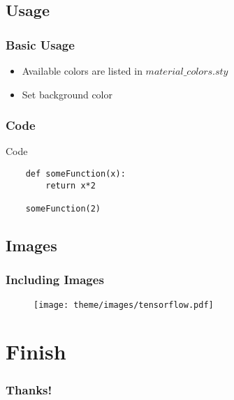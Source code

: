 \documentclass{beamer}
\begin{document}
\subsection{Usage}
\begin{frame}
	\frametitle{Basic Usage}
	\begin{itemize}
		\item Available colors are listed in $material\_colors.sty$
		\item Set background color
	\end{itemize}
\end{frame}

\subsubsection{Code}
\begin{frame}[fragile=singleslide]{Code}
	\begin{lstlisting}
	def someFunction(x):
		return x*2

	someFunction(2)
	\end{lstlisting}
\end{frame}

\subsection{Images}
\begin{frame}
	\frametitle{Including Images}

	\begin{figure}
		\centering
		\texttt{[image: theme/images/tensorflow.pdf]}
	\end{figure}

\end{frame}

\section{Finish}
\begin{frame}
	\frametitle{Thanks!}
\end{frame}
\end{document}
